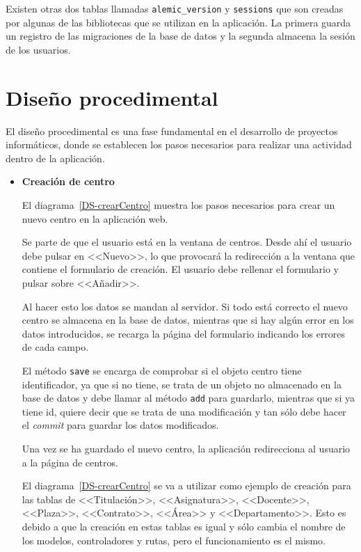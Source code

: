 Existen otras dos tablas llamadas \texttt{alemic\_version} y \texttt{sessions} que son creadas por algunas de las bibliotecas que se utilizan en la aplicación. 
La primera guarda un registro de las migraciones de la base de datos y la segunda almacena la sesión de los usuarios.

\section{Diseño procedimental}
El diseño procedimental es una fase fundamental en el desarrollo de proyectos informáticos, donde se establecen los pasos necesarios para realizar una actividad dentro de la aplicación.

\begin{itemize}
\item \textbf{Creación de centro}

El diagrama~\ref{DS-crearCentro} muestra los pasos necesarios para crear un nuevo centro en la aplicación web.

Se parte de que el usuario está en la ventana de centros.
Desde ahí el usuario debe pulsar en <<Nuevo>>, lo que provocará la redirección a la ventana que contiene el formulario de creación.
El usuario debe rellenar el formulario y pulsar sobre <<Añadir>>.

Al hacer esto los datos se mandan al servidor.
Si todo está correcto el nuevo centro se almacena en la base de datos, mientras que si hay algún error en los datos introducidos, se recarga la página del formulario indicando los errores de cada campo.

El método \texttt{save} se encarga de comprobar si el objeto centro tiene identificador, ya que si no tiene, se trata de un objeto no almacenado en la base de datos y debe llamar al método \texttt{add} para guardarlo, mientras que si ya tiene id, quiere decir que se trata de una modificación y tan sólo debe hacer el \textit{commit} para guardar los datos modificados.

Una vez se ha guardado el nuevo centro, la aplicación redirecciona al usuario a la página de centros.

El diagrama~\ref{DS-crearCentro} se va a utilizar como ejemplo de creación para las tablas de <<Titulación>>, <<Asignatura>>, <<Docente>>, <<Plaza>>, <<Contrato>>, <<Área>> y <<Departamento>>.
Esto es debido a que la creación en estas tablas es igual y sólo cambia el nombre de los modelos, controladores y rutas, pero el funcionamiento es el mismo.


\end{itemize}
